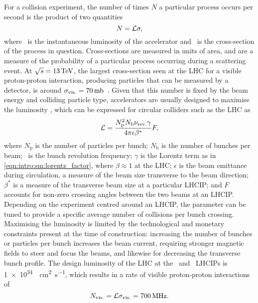 For a collision experiment, the number of times $N$ a particular process occurs 
per second is the product of two quantities
\begin{equation}
  N = \mathcal{L}\sigma,
  \label{eqn:intro:lhc:lumi_xsec}
\end{equation}
where \lumi\ is the instantaneous luminosity of the accelerator and \xsec\ is 
the cross-section of the process in question.
Cross-sections are measured in units of area, and are a measure of the 
probability of a particular process occurring during a scattering event.
At $\sqrts = \SI{13}{\TeV}$, the largest cross-section seen at the \ac{LHC} for 
a visible proton-proton interaction, producing particles that can be measured 
by a detector, is around $\xsecppvis = 
\SI{70}{\milli\barn}$~\cite{Aaboud:2016mmw,CMS:2016ael}.
Given that this number is fixed by the beam energy and colliding particle type, 
accelerators are usually designed to maximise the luminosity \lumi, which can 
be expressed for circular colliders such as the \ac{LHC} as
\begin{equation}
  \mathcal{L} = \frac{N_{\text{p}}^{2}N_{\text{b}}\nu_{\textnormal{rev.}}\gamma}{4\pi\epsilon\beta^{*}}F,
  \label{eqn:intro:lhc:inst_lumi}
\end{equation}
where $N_{\text{p}}$ is the number of particles per bunch; $N_{\text{b}}$ is 
the number of bunches per beam; \revfreq\ is the bunch revolution frequency; $\gamma$ 
is the Lorentz term as in \cref{eqn:intro:sm:lorentz_factor}, where $\beta 
\approx 1$ at the \ac{LHC}; $\epsilon$ is the beam emittance during 
circulation, a measure of the beam size transverse to the beam direction; 
$\beta^{*}$ is a measure of the transverse beam size at a particular 
\ac{LHCIP}; and $F$ accounts for non-zero crossing angles between the two beams 
at an \ac{LHCIP}.
Depending on the experiment centred around an \ac{LHCIP}, the \betastar 
parameter can be tuned to provide a specific average number of collisions per 
bunch crossing.
Maximising the luminosity is limited by the technological and monetary 
constraints present at the time of construction: increasing the number of 
bunches or particles per bunch increases the beam current, requiring stronger 
magnetic fields to steer and focus the beams, and likewise for decreasing the 
transverse bunch profile.
The design luminosity of the \ac{LHC} at the \atlas\ and \cms\ \acp{LHCIP} is
\SI{1e34}{\per\square\centi\metre\per\second}, which results in a rate of 
visible proton-proton interactions of
\begin{equation}
  N_{\text{vis.}} = \mathcal{L}\sigma_{\textnormal{vis.}}
                  = \SI{700}{\mega\hertz}.
  \label{eqn:intro:lhc:nppvis}
\end{equation}

